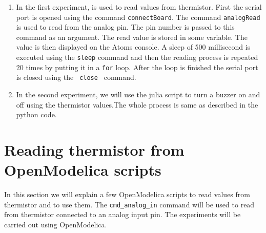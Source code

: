 \begin{enumerate}
\item In the first experiment,  is used to read
  values from thermistor. First the serial port is opened using the
  command {\tt connectBoard}. The command {\tt analogRead} is used to read from the
  analog pin. The pin number is passed to this command as an
  argument. The read value is stored in some variable. The value is
  then displayed on the Atoms console. A sleep of 500 millisecond is
  executed using the {\tt sleep} command and then the reading process
  is repeated 20 times by putting it in a {\tt for} loop. After the
  loop is finished the serial port is closed using the {\tt
    close } command.

\item In the second experiment, we will use the julia script to
  turn a buzzer on and off using the thermistor values.The whole
  process is same as described in the python code. 
\end{enumerate}


\section {Reading thermistor from OpenModelica scripts}
In this section we will explain a few OpenModelica scripts to read values
from thermistor and to use them.  The {\tt cmd\_analog\_in} command
will be used to read from thermistor connected to an analog input
pin. The experiments will be carried out using OpenModelica.

